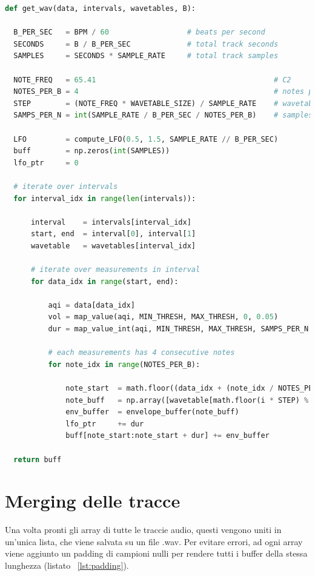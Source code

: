 \begin{lstlisting}[language=Python,caption={Generazione del buffer audio.},label={lst:audio_buffer}]
def get_wav(data, intervals, wavetables, B):

  B_PER_SEC   = BPM / 60                  # beats per second
  SECONDS     = B / B_PER_SEC             # total track seconds
  SAMPLES     = SECONDS * SAMPLE_RATE     # total track samples

  NOTE_FREQ   = 65.41                                         # C2
  NOTES_PER_B = 4                                             # notes per beat
  STEP        = (NOTE_FREQ * WAVETABLE_SIZE) / SAMPLE_RATE    # wavetable step
  SAMPS_PER_N = int(SAMPLE_RATE / B_PER_SEC / NOTES_PER_B)    # samples per note

  LFO         = compute_LFO(0.5, 1.5, SAMPLE_RATE // B_PER_SEC)
  buff        = np.zeros(int(SAMPLES))
  lfo_ptr     = 0

  # iterate over intervals
  for interval_idx in range(len(intervals)):

      interval    = intervals[interval_idx]
      start, end  = interval[0], interval[1]
      wavetable   = wavetables[interval_idx]

      # iterate over measurements in interval
      for data_idx in range(start, end):

          aqi = data[data_idx]
          vol = map_value(aqi, MIN_THRESH, MAX_THRESH, 0, 0.05)
          dur = map_value_int(aqi, MIN_THRESH, MAX_THRESH, SAMPS_PER_N // 4, SAMPS_PER_N)

          # each measurements has 4 consecutive notes
          for note_idx in range(NOTES_PER_B):

              note_start  = math.floor((data_idx + (note_idx / NOTES_PER_B)) * (SAMPLE_RATE / B_PER_SEC))
              note_buff   = np.array([wavetable[math.floor(i * STEP) % WAVETABLE_SIZE] * vol * LFO(i + lfo_ptr) for i in range(dur)])
              env_buffer  = envelope_buffer(note_buff)
              lfo_ptr     += dur
              buff[note_start:note_start + dur] += env_buffer

  return buff
\end{lstlisting}

\section{Merging delle tracce}
Una volta pronti gli array di tutte le traccie audio, questi vengono uniti in un'unica lista, che viene salvata su un file .wav.
Per evitare errori, ad ogni array viene aggiunto un padding di campioni nulli per rendere tutti i buffer della stessa lunghezza (listato ~\ref{lst:padding}).

